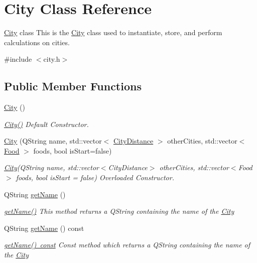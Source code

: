 \hypertarget{class_city}{}\section{City Class Reference}
\label{class_city}


\mbox{\hyperlink{class_city}{City}} class This is the \mbox{\hyperlink{class_city}{City}} class used to instantiate, store, and perform calculations on cities.  




{\ttfamily \#include $<$city.\+h$>$}

\subsection*{Public Member Functions}
\begin{DoxyCompactItemize}
\item 
\mbox{\hyperlink{class_city_a1b1f549430f0a7ecd0ec7b1605415193}{City}} ()
\begin{DoxyCompactList}\small\item\em \mbox{\hyperlink{class_city_a1b1f549430f0a7ecd0ec7b1605415193}{City()}} Default Constructor. \end{DoxyCompactList}\item 
\mbox{\hyperlink{class_city_a45f0a3c80b0e4ff9dc33256d2ff5eb0d}{City}} (Q\+String name, std\+::vector$<$ \mbox{\hyperlink{struct_city_distance}{City\+Distance}} $>$ other\+Cities, std\+::vector$<$ \mbox{\hyperlink{class_food}{Food}} $>$ foods, bool is\+Start=false)
\begin{DoxyCompactList}\small\item\em \mbox{\hyperlink{class_city}{City}}(Q\+String name, std\+::vector$<$\+City\+Distance$>$ other\+Cities, std\+::vector$<$\+Food$>$ foods, bool is\+Start = false) Overloaded Constructor. \end{DoxyCompactList}\item 
Q\+String \mbox{\hyperlink{class_city_afe733410d61155d8a4013293b0b72408}{get\+Name}} ()
\begin{DoxyCompactList}\small\item\em \mbox{\hyperlink{class_city_afe733410d61155d8a4013293b0b72408}{get\+Name()}} This method returns a Q\+String containing the name of the \mbox{\hyperlink{class_city}{City}} \end{DoxyCompactList}\item 
Q\+String \mbox{\hyperlink{class_city_ad73598d937870a165cb530958106ff07}{get\+Name}} () const
\begin{DoxyCompactList}\small\item\em \mbox{\hyperlink{class_city_ad73598d937870a165cb530958106ff07}{get\+Name() const}} Const method which returns a Q\+String containing the name of the \mbox{\hyperlink{class_city}{City}} \end{DoxyCompactList}\item 

\end{DoxyCompactItemize}
